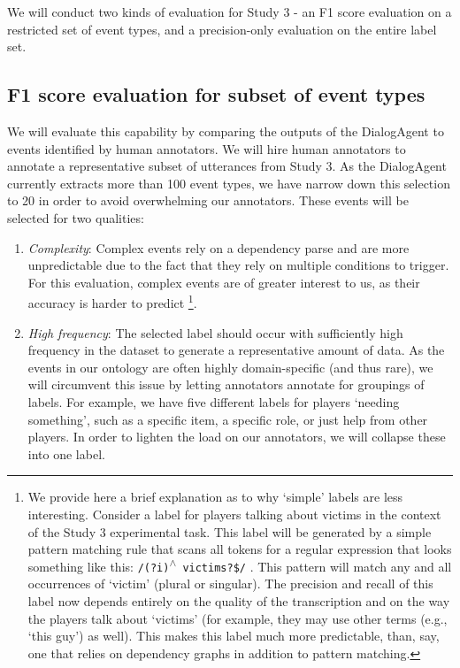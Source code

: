 We will conduct two kinds of evaluation for Study 3 - an F1 score evaluation on
a restricted set of event types, and a precision-only evaluation on the entire
label set.

\subsection{F1 score evaluation for subset of event types}

We will evaluate this capability by comparing the outputs of the DialogAgent to
events identified by human annotators. We will hire human annotators to
annotate a representative subset of utterances from Study 3. As the DialogAgent
currently extracts more than 100 event types, we have narrow down this
selection to 20 in order to avoid overwhelming our annotators. These events
will be selected for two qualities:

\begin{enumerate}

    \item \emph{Complexity}: Complex events rely on a dependency parse and are
        more unpredictable due to the fact that they rely on multiple
        conditions to trigger. For this evaluation, complex events are of
        greater interest to us, as their accuracy is harder to predict
        \footnote{We provide here a brief explanation as to why `simple' labels
            are less interesting. Consider a label for players talking about
            victims in the context of the Study 3 experimental task.  This
            label will be generated by a simple pattern matching rule that
            scans all tokens for a regular expression that looks something like
            this: \texttt{/(?i){\textsuperscript{$\wedge$} }victims?\$/} .
            This pattern will match any and all occurrences of `victim' (plural
            or singular). The precision and recall of this label now depends
            entirely on the quality of the transcription and on the way the
            players talk about `victims' (for example, they may use other terms
            (e.g., `this guy') as well). This makes this label much more
            predictable, than, say, one that relies on dependency graphs in
        addition to pattern matching.}.

    \item \emph{High frequency}: The selected label should occur with sufficiently
        high frequency in the dataset to generate a representative amount of data.
        As the events in our ontology are often highly domain-specific (and thus
        rare), we will circumvent this issue by letting annotators annotate for
        groupings of labels. For example, we have five different labels for players
        `needing something', such as a specific item, a specific role, or just help
        from other players. In order to lighten the load on our annotators, we will
        collapse these into one label.

\end{enumerate}

